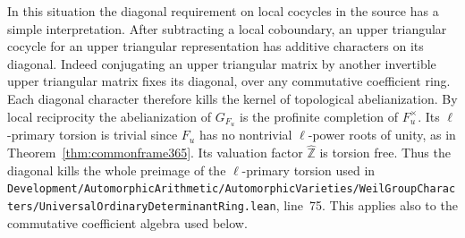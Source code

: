 \documentclass[a4paper,11pt]{article}
\theoremstyle{definition}
\theoremstyle{remark}
\newcommand{\ZZ}{\mathbb Z}\newcommand{\ord}{\operatorname{ord}}
\newcommand{\srcloc}[2]{{\small\nolinkurl{#1.lean}}, line~#2}
\numberwithin{equation}{section}
\begin{document}
In this situation the diagonal requirement on local cocycles
in the source has a simple interpretation. After subtracting
a local coboundary, an upper triangular cocycle for an upper
triangular representation has additive characters on its
diagonal. Indeed conjugating an upper triangular matrix by
another invertible upper triangular matrix fixes its diagonal,
over any commutative coefficient ring. Each diagonal character
therefore kills the kernel of topological abelianization.
By local reciprocity the abelianization of \(G_{F_u}\) is
the profinite completion of \(F_u^\times\). Its
\(\ell\)-primary torsion is trivial since \(F_u\) has no
nontrivial \(\ell\)-power roots of unity, as in
Theorem~\ref{thm:commonframe365}. Its valuation factor
\(\widehat{\ZZ}\) is torsion free. Thus the diagonal kills
the whole preimage of the \(\ell\)-primary torsion used in
\srcloc{Development/AutomorphicArithmetic/AutomorphicVarieties/WeilGroupCharacters/UniversalOrdinaryDeterminantRing}{75}.
This applies also to the commutative coefficient algebra
used below.
\end{document}
